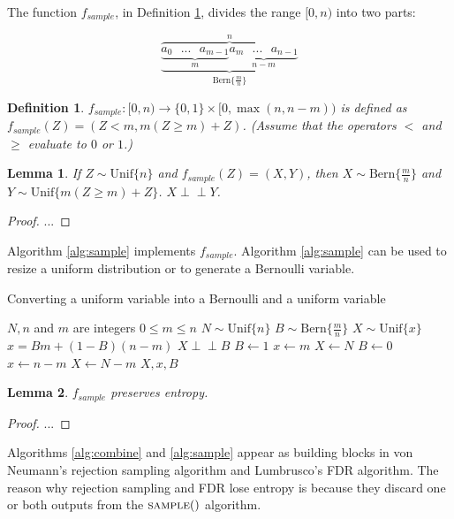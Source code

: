 \documentclass[12pt]{article}
\newtheorem{lemma}{Lemma}
\newtheorem{definition}{Definition}
\newcommand{\indep}{\perp\!\!\!\perp}
\newcommand{\unif}[1]{\mathrm{Unif}\{#1\}}
\newcommand{\bern}[1]{\mathrm{Bern}\{#1\}}
\begin{document}
The function $f_{sample}$, in Definition \ref{def:sample}, divides the range $[0,n)$ into two parts:

\[
\overbrace{
    \underbrace{
        \underbrace{a_0 \text{   } ... \text{   } a_{m-1}}_{m}
        \underbrace{a_m \text{   } ... \text{   } a_{n-1}}_{n-m}}
    }_{\bern{\frac{m}{n}}}^{n}
\]

\begin{definition}
$f_{sample}: [0,n) \rightarrow \{0,1\} \times [0,\max(n,n-m))$ is defined as $f_{sample}(Z) = (Z<m, m(Z\ge m) + Z)$. (Assume that the operators $<$ and $\ge$ evaluate to $0$ or $1$.)
\label{def:sample}
\end{definition}

\begin{lemma}
If $Z \sim \unif{n}$ and $f_{sample}(Z) = (X,Y)$, then $X \sim \bern{\frac{m}{n}}$ and $Y \sim \unif{m(Z \ge m)+Z}$. $X \indep Y$.
\end{lemma}

\begin{proof}
    ...
\end{proof}

Algorithm \ref{alg:sample} implements $f_{sample}$. Algorithm \ref{alg:sample} can be used to resize a uniform distribution or to generate a Bernoulli variable.


\begin{algorithm}
\caption{Converting a uniform variable into a Bernoulli and a uniform variable}
\label{alg:sample}
\begin{algorithmic}[1]
    \Require $N, n$ and $m$ are integers 
    \Require $0 \le m \le n$
    \Require $N \sim \unif{n}$
    \Ensure $B \sim \bern{\frac{m}{n}}$
    \Ensure $X \sim \unif{x}$
    \Ensure $x = Bm + (1-B)(n-m)$
    \Ensure $X \indep B$
    \State $B \gets 1$  
    \State $x \gets m$
    \State $X \gets N$
  \Else
    \State $B \gets 0$  
    \State $x \gets n-m$
    \State $X \gets N-m$
  \EndIf
  \State \Return $X, x, B$
\EndProcedure
\end{algorithmic}
\end{algorithm}

\begin{lemma}
    $f_{sample}$ preserves entropy.
\end{lemma}

\begin{proof}
    ...
\end{proof}

Algorithms \ref{alg:combine} and \ref{alg:sample} appear as building blocks in von Neumann's rejection sampling algorithm and Lumbrusco's FDR algorithm. The reason why rejection sampling and FDR lose entropy is because they discard one or both outputs from the $\textsc{sample}()$ algorithm.
\end{document}

